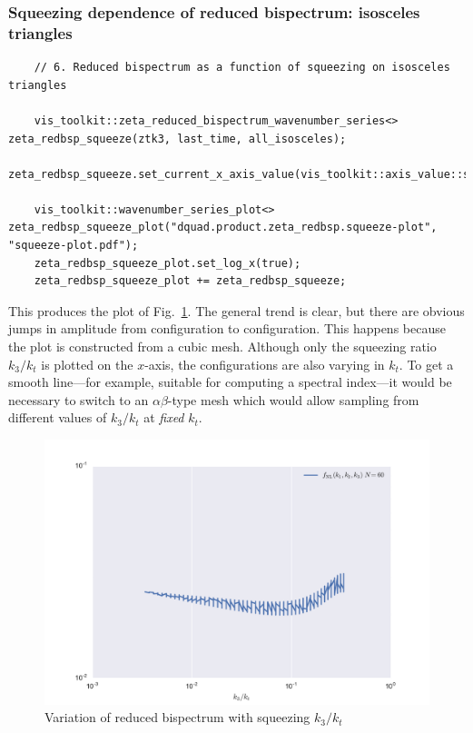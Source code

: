\documentclass[11pt,a4paper]{article}
\begin{document}
\subsubsection{Squeezing dependence of reduced bispectrum: isosceles triangles}
\begin{verbatim}
    // 6. Reduced bispectrum as a function of squeezing on isosceles triangles

    vis_toolkit::zeta_reduced_bispectrum_wavenumber_series<> zeta_redbsp_squeeze(ztk3, last_time, all_isosceles);
    zeta_redbsp_squeeze.set_current_x_axis_value(vis_toolkit::axis_value::squeeze_k3);

    vis_toolkit::wavenumber_series_plot<> zeta_redbsp_squeeze_plot("dquad.product.zeta_redbsp.squeeze-plot", "squeeze-plot.pdf");
    zeta_redbsp_squeeze_plot.set_log_x(true);
    zeta_redbsp_squeeze_plot += zeta_redbsp_squeeze;
\end{verbatim}
This produces the plot of Fig.~\ref{fig:squeeze-plot}.
The general trend is clear, but there are obvious jumps in amplitude
from configuration to configuration.
This happens because the plot is constructed from a cubic mesh.
Although only the squeezing ratio $k_3/k_t$ is plotted on the $x$-axis,
the configurations are also varying in $k_t$.
To get a smooth line---for example, suitable for computing a spectral index---it
would be necessary to switch to an $\alpha\beta$-type mesh
which would allow sampling from different values of $k_3/k_t$ at
\emph{fixed} $k_t$.
\begin{figure}
    \begin{center}
        \includegraphics[scale=0.75]{Outputs/squeeze-plot}    
    \end{center}
    \caption{\label{fig:squeeze-plot}Variation of reduced bispectrum with squeezing
    $k_3/k_t$}
\end{figure}
\end{document}
